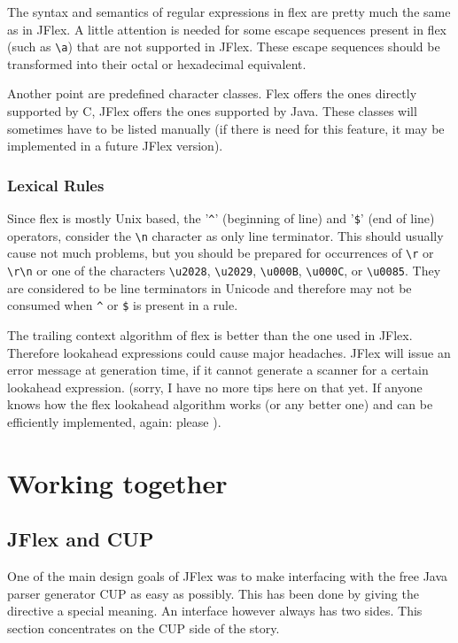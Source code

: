 \documentclass[11pt]{scrartcl}
\begin{document}
The syntax and semantics of regular expressions in flex are pretty much the
same as in JFlex. A little attention is needed for some escape sequences 
present in flex (such as \verb+\a+) that are not supported in JFlex. These
escape sequences should be transformed into their octal or hexadecimal 
equivalent. 

Another point are predefined character classes. Flex offers the ones directly
supported by C, JFlex offers the ones supported by Java. These classes will
sometimes have to be listed manually (if there is need for this feature, it
may be implemented in a future JFlex version).

\subsubsection{Lexical Rules}
Since flex is mostly Unix based, the '\verb+^+' (beginning of line) and
'\verb+$+' (end of line) operators, consider the \verb+\n+ character as %
only line terminator. This should usually cause not much problems, but you
should be prepared for occurrences of \verb+\r+ or \verb+\r\n+ or one of
the characters \verb+\u2028+, \verb+\u2029+, \verb+\u000B+, \verb+\u000C+, 
or \verb+\u0085+. They are considered to be line terminators in Unicode and 
therefore may not be consumed when 
\verb+^+ or \verb+$+ is present in a rule.%

The trailing context algorithm of flex is better than the one used in
JFlex. Therefore lookahead expressions could cause major headaches. JFlex
will issue an error message at generation time, if it cannot generate
a scanner for a certain lookahead expression. (sorry, I have no more tips here
on that yet. If anyone knows how the flex lookahead algorithm works (or any better one)
and can be efficiently implemented, again: please ).

\section{Working together\label{WorkingTog}}

\subsection{JFlex and CUP\label{CUPWork}}
One of the main design goals of JFlex was to make interfacing with the free
Java parser generator CUP \cite{CUP} as easy as possibly. 
This has been done by giving
the \texttt{} directive a special meaning. An
interface however always has two sides. This section concentrates on the
CUP side of the story.
\end{document}
